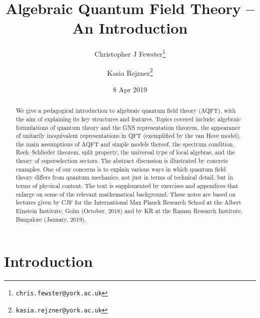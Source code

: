 \documentclass[12pt]{article}
\newcommand{\1}{\mathds{1}}                         %
\begin{document}
	\title{Algebraic Quantum Field Theory --\\ An Introduction} 
	
	
	\author[1]{Christopher J Fewster\thanks{\tt chris.fewster@york.ac.uk}}
	\author[1]{Kasia Rejzner\thanks{\tt kasia.rejzner@york.ac.uk}}
 
	\date{8 Apr 2019}%
	\maketitle 
	\begin{abstract}  
	We give a pedagogical introduction to algebraic quantum field theory (AQFT), with the aim of explaining its key structures and features. Topics covered include: algebraic formulations of quantum theory and the GNS representation theorem, the appearance of unitarily inequivalent representations in QFT (exemplified by the van Hove model), the main assumptions of AQFT and simple models thereof, the spectrum condition, Reeh--Schlieder theorem, split property, the universal type of local algebras, and the theory of superselection sectors. The abstract discussion is illustrated by concrete examples. One of our concerns is to explain various ways in which quantum field theory differs from quantum mechanics, not just in terms of technical detail, but in terms of physical content. 
	The text is supplemented by exercises and appendices that enlarge on some of the relevant mathematical background. These notes are based on lectures given by CJF for the International Max Planck Research School at the Albert Einstein Institute, Golm (October, 2018) and by KR at the Raman Research Institute, Bangalore (January, 2019). 
	\end{abstract} 
	\newpage
	\tableofcontents 
	\newpage
	\section{Introduction}
		
\end{document}
